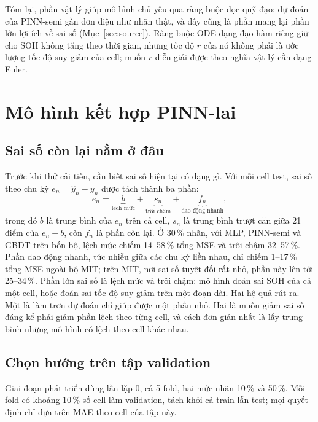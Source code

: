 \documentclass[12pt,a4paper,oneside]{report}
\theoremstyle{plain}
\theoremstyle{definition}
\begin{document}
Tóm lại, phần vật lý giúp mô hình chủ yếu qua ràng buộc dọc quỹ đạo: dự đoán của PINN-semi gần đơn điệu như nhãn
thật, và đây cũng là phần mang lại phần lớn lợi ích về sai số (Mục~\ref{sec:source}). Ràng buộc ODE dạng đạo hàm riêng
giữ cho SOH không tăng theo thời gian, nhưng tốc độ $r$ của nó không phải là ước lượng tốc độ suy giảm của cell; muốn
$r$ diễn giải được theo nghĩa vật lý cần dạng Euler.


\section{Mô hình kết hợp PINN-lai}\label{sec:improve}
\subsection{Sai số còn lại nằm ở đâu}\label{sec:errdecomp}

Trước khi thử cải tiến, cần biết sai số hiện tại có dạng gì. Với mỗi cell test, sai số theo chu kỳ
$e_n = \hat y_n - y_n$ được tách thành ba phần:
\begin{equation}
e_n = \underbrace{b}_{\text{lệch mức}} + \underbrace{s_n}_{\text{trôi chậm}} + \underbrace{f_n}_{\text{dao động nhanh}},
\end{equation}
trong đó $b$ là trung bình của $e_n$ trên cả cell, $s_n$ là trung bình trượt căn giữa 21 điểm của $e_n - b$, còn $f_n$
là phần còn lại. Ở 30\,\% nhãn, với MLP, PINN-semi và GBDT trên bốn bộ, lệch mức chiếm 14--58\,\% tổng MSE và trôi chậm
32--57\,\%. Phần dao động nhanh, tức nhiễu giữa các chu kỳ liền nhau, chỉ chiếm 1--17\,\% tổng MSE ngoài bộ MIT; trên MIT, nơi
sai số tuyệt đối rất nhỏ, phần này lên tới 25--34\,\%. Phần lớn sai số là lệch mức và trôi chậm: mô hình đoán sai
SOH của cả một cell, hoặc đoán sai tốc độ suy giảm trên một đoạn dài. Hai hệ quả rút ra. Một là làm trơn dự đoán chỉ
giúp được một phần nhỏ. Hai là muốn giảm sai số đáng kể phải giảm phần lệch theo từng cell, và cách đơn giản nhất là
lấy trung bình những mô hình có lệch theo cell khác nhau.

\subsection{Chọn hướng trên tập validation}\label{sec:devproto}

Giai đoạn phát triển dùng lần lặp 0, cả 5 fold, hai mức nhãn 10\,\% và 50\,\%. Mỗi fold có khoảng 10\,\% số cell
làm validation, tách khỏi cả train lẫn test; mọi quyết định chỉ dựa trên MAE theo cell của tập này.
\end{document}
